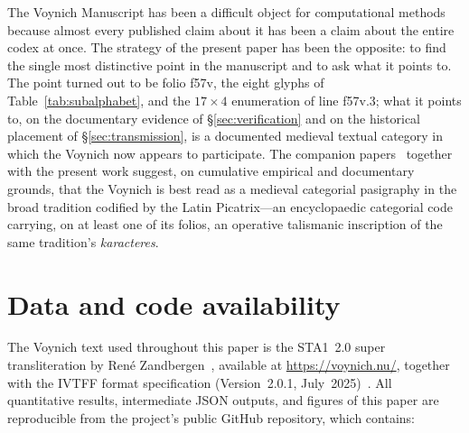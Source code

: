 The Voynich Manuscript has been a difficult object for computational
methods because almost every published claim about it has been a
claim about the entire codex at once. The strategy of the present
paper has been the opposite: to find the single most distinctive
point in the manuscript and to ask what it points to. The point
turned out to be folio f57v, the eight glyphs of
Table~\ref{tab:subalphabet}, and the $17\!\times\!4$ enumeration of
line f57v.3; what it points to, on the documentary evidence of
\S\ref{sec:verification} and on the historical placement of
\S\ref{sec:transmission}, is a documented medieval textual category
in which the Voynich now appears to participate. The companion
papers~\citep{jimenez2026negative,jimenez2026twotier} together with
the present work suggest, on cumulative empirical and documentary
grounds, that the Voynich is best read as a medieval categorial
pasigraphy in the broad tradition codified by the Latin Picatrix---an
encyclopaedic categorial code carrying, on at least one of its
folios, an operative talismanic inscription of the same tradition's
\textit{karacteres}.


\section*{Data and code availability}
\label{sec:data_availability}

The Voynich text used throughout this paper is the STA1~2.0 super
transliteration by Ren\'e Zandbergen~\citep{zandbergen_sta1}, available
at \url{https://voynich.nu/}, together with the IVTFF format
specification (Version~2.0.1, July~2025)~\citep{zandbergen_ivtff}. All
quantitative results, intermediate JSON outputs, and figures of this
paper are reproducible from the project's public GitHub repository,
which contains:

